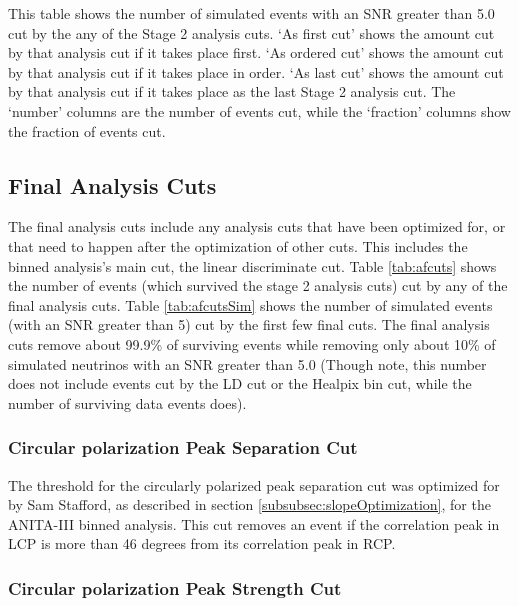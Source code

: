 \begin{table}[h]
\centering
{}
\caption[Stage 2 Analysis Cuts Table for Simulated Events]{This table shows the number of simulated events with an SNR greater than 5.0 cut by the any of the Stage 2 analysis cuts.  `As first cut' shows the amount cut by that analysis cut if it takes place first.  `As ordered cut' shows the amount cut by that analysis cut if it takes place in order.  `As last cut' shows the amount cut by that analysis cut if it takes place as the last Stage 2 analysis cut.  The `number' columns are the number of events cut, while the `fraction' columns show the fraction of events cut.}
\label{tab:a2cutsSim}
\end{table}

\subsection{Final Analysis Cuts} \label{subsec:facuts}

The final analysis cuts include any analysis cuts that have been optimized for, or that need to happen after the optimization of other cuts.  This includes the binned analysis's main cut, the linear discriminate cut.  Table \ref{tab:afcuts} shows the number of events (which survived the stage 2 analysis cuts) cut by any of the final analysis cuts.  Table \ref{tab:afcutsSim} shows the number of simulated events (with an SNR greater than 5) cut by the first few final cuts.  The final analysis cuts remove about 99.9\% of surviving events while removing only about 10\% of simulated neutrinos with an SNR greater than 5.0 (Though note, this number does not include events cut by the LD cut or the Healpix bin cut, while the number of surviving data events does).

\subsubsection{Circular polarization Peak Separation Cut}

The threshold for the circularly polarized peak separation cut was optimized for by Sam Stafford, as described in section \ref{subsubsec:slopeOptimization}, for the ANITA-III binned analysis.  This cut removes an event if the correlation peak in LCP is more than 46 degrees from its correlation peak in RCP.

\subsubsection{Circular polarization Peak Strength Cut}

